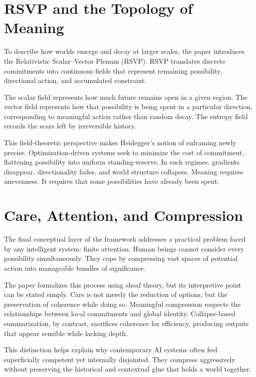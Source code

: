 \documentclass[11pt]{article}
\begin{document}
\section{RSVP and the Topology of Meaning}

To describe how worlds emerge and decay at larger scales, the paper introduces the Relativistic Scalar–Vector Plenum (RSVP). RSVP translates discrete commitments into continuous fields that represent remaining possibility, directional action, and accumulated constraint.

The scalar field represents how much future remains open in a given region. The vector field represents how that possibility is being spent in a particular direction, corresponding to meaningful action rather than random decay. The entropy field records the scars left by irreversible history.

This field-theoretic perspective makes Heidegger’s notion of enframing newly precise. Optimization-driven systems seek to minimize the cost of commitment, flattening possibility into uniform standing-reserve. In such regimes, gradients disappear, directionality fades, and world structure collapses. Meaning requires unevenness. It requires that some possibilities have already been spent.

\section{Care, Attention, and Compression}

The final conceptual layer of the framework addresses a practical problem faced by any intelligent system: finite attention. Human beings cannot consider every possibility simultaneously. They cope by compressing vast spaces of potential action into manageable bundles of significance.

The paper formalizes this process using sheaf theory, but its interpretive point can be stated simply. Care is not merely the reduction of options, but the preservation of coherence while doing so. Meaningful compression respects the relationships between local commitments and global identity. Collapse-based summarization, by contrast, sacrifices coherence for efficiency, producing outputs that appear sensible while lacking depth.

This distinction helps explain why contemporary AI systems often feel superficially competent yet internally disjointed. They compress aggressively without preserving the historical and contextual glue that holds a world together.
\end{document}
